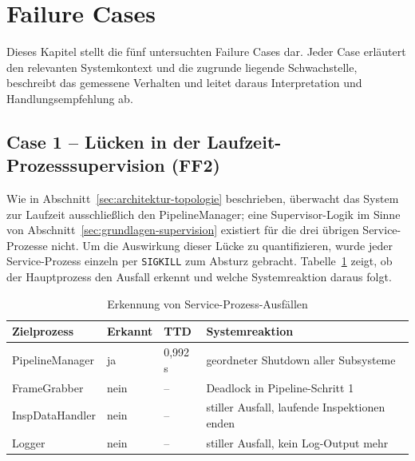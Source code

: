 
\section{Failure Cases}
\label{sec:cases}

Dieses Kapitel stellt die fünf untersuchten Failure Cases dar. Jeder Case erläutert den
relevanten Systemkontext und die zugrunde liegende Schwachstelle, beschreibt das gemessene
Verhalten und leitet daraus Interpretation und Handlungsempfehlung ab.

\subsection[Case 1 -- Lücken in der Laufzeit-Prozesssupervision]{Case 1 -- Lücken in der Laufzeit-Prozesssupervision (FF2)}
\label{sec:case1}

Wie in Abschnitt~\ref{sec:architektur-topologie} beschrieben, überwacht das System zur
Laufzeit ausschließlich den PipelineManager; eine Supervisor-Logik im Sinne von
Abschnitt~\ref{sec:grundlagen-supervision} existiert für die drei übrigen Service-Prozesse
nicht. Um die Auswirkung dieser Lücke zu quantifizieren, wurde jeder Service-Prozess
einzeln per \texttt{SIGKILL} zum Absturz gebracht. Tabelle~\ref{tab:case1} zeigt, ob der
Hauptprozess den Ausfall erkennt und welche Systemreaktion daraus folgt.

\begin{table}[htbp]
    \centering
    \caption{Erkennung von Service-Prozess-Ausfällen}
    \label{tab:case1}
    \begin{tabularx}{\textwidth}{lllX}
        \hline
        \textbf{Zielprozess} & \textbf{Erkannt} & \textbf{TTD} & \textbf{Systemreaktion} \\
        \hline
        PipelineManager  & ja   & 0,992\,s & geordneter Shutdown aller Subsysteme \\
        FrameGrabber     & nein & --       & Deadlock in Pipeline-Schritt 1 \\
        InspDataHandler  & nein & --       & stiller Ausfall, laufende Inspektionen enden \\
        Logger           & nein & --       & stiller Ausfall, kein Log-Output mehr \\
        \hline
    \end{tabularx}
\end{table}

